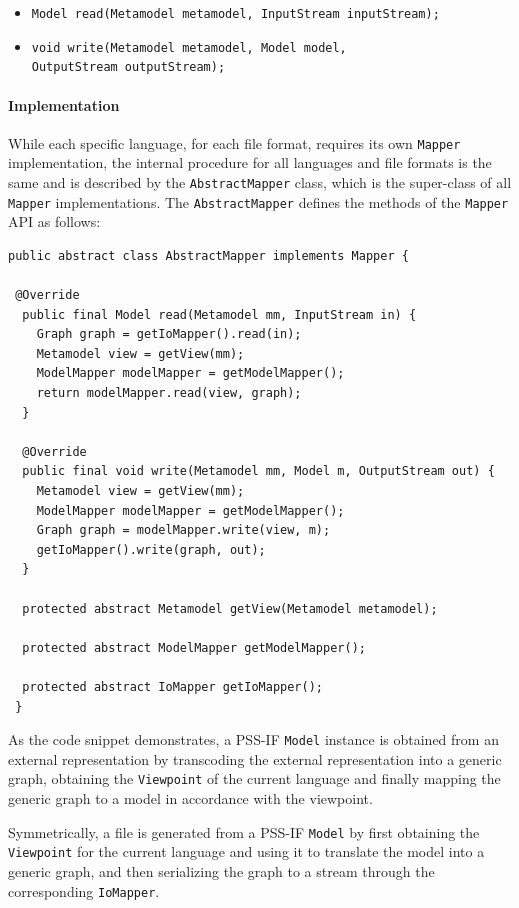 \begin{itemize}
\item \texttt{Model read(Metamodel metamodel, InputStream inputStream);}
\item \texttt{void write(Metamodel metamodel, Model model,}\\ \texttt{OutputStream outputStream);}
\end{itemize}

\paragraph{Implementation} While each specific language, for each file format, requires its own \texttt{Mapper} implementation, the internal procedure for all languages and file formats is the same and is described by the \texttt{AbstractMapper} class, which is the super-class of all \texttt{Mapper} implementations. The \texttt{AbstractMapper} defines the methods of the \texttt{Mapper} API as follows:

\begin{verbatim}
public abstract class AbstractMapper implements Mapper {

 @Override
  public final Model read(Metamodel mm, InputStream in) {
    Graph graph = getIoMapper().read(in);
    Metamodel view = getView(mm);
    ModelMapper modelMapper = getModelMapper();
    return modelMapper.read(view, graph);
  }

  @Override
  public final void write(Metamodel mm, Model m, OutputStream out) {
    Metamodel view = getView(mm);
    ModelMapper modelMapper = getModelMapper();
    Graph graph = modelMapper.write(view, m);
    getIoMapper().write(graph, out);
  }

  protected abstract Metamodel getView(Metamodel metamodel);

  protected abstract ModelMapper getModelMapper();

  protected abstract IoMapper getIoMapper();
 }
\end{verbatim}

As the code snippet demonstrates, a PSS-IF \texttt{Model} instance is obtained from an external representation by transcoding the external representation into a generic graph, obtaining the \texttt{Viewpoint} of the current language and finally mapping the generic graph to a model in accordance with the viewpoint.

Symmetrically, a file is generated from a PSS-IF \texttt{Model} by first obtaining the \texttt{Viewpoint} for the current language and using it to translate the model into a generic graph, and then serializing the graph to a stream through the corresponding \texttt{IoMapper}.

